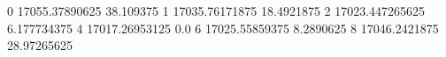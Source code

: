 0 17055.37890625 38.109375
1 17035.76171875 18.4921875
2 17023.447265625 6.177734375
4 17017.26953125 0.0
6 17025.55859375 8.2890625
8 17046.2421875 28.97265625
